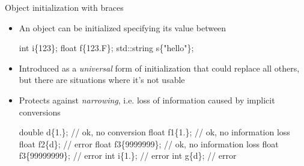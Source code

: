 \begin{frame}[fragile]{Object initialization with braces}

  \begin{itemize}
  \item An object can be initialized specifying its value between \code{\{\}}

    \begin{codeblock}
int i\{123\};
float f\{123.F\};
std::string s\{"hello"\};\end{codeblock}

  \item Introduced as a \textit{universal} form of initialization that could
    replace all others, but there are situations where it's not usable

  \item Protects against \textit{narrowing}, i.e. loss of information caused by
    implicit conversions

    \begin{codeblock}
double d\{1.\};         // ok, no conversion
float f1\{1.\};         // ok, no information loss
float f2\{d\};          // error
float f3\{9\textquotesingle{}999\textquotesingle{}999\};  // ok, no information loss
float f3\{99\textquotesingle{}999\textquotesingle{}999\}; // error
int i\{1.\};            // error
int g\{d\};             // error\end{codeblock}
  \end{itemize}
\end{frame}

